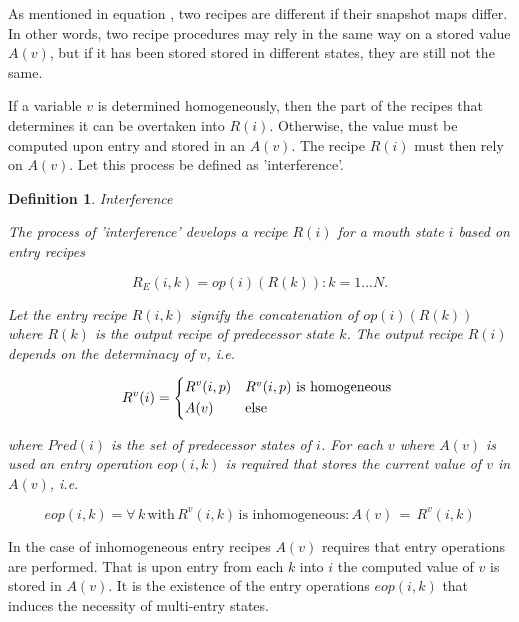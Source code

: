 \documentclass[12pt,a4paper]{scrartcl}
\newtheorem{definition}{Definition}
\begin{document}
As mentioned in equation \label{eq:snapshot-map-difference}, two recipes are
different if their snapshot maps differ. In other words, two recipe procedures
may rely in the same way on a stored value $A(v)$, but if it has been stored
stored in different states, they are still not the same.

If a variable $v$ is determined homogeneously, then the part of the recipes
that determines it can be overtaken into $R(i)$. Otherwise, the value must be
computed upon entry and stored in an $A(v)$. The recipe $R(i)$ must then rely
on $A(v)$. Let this process be defined as 'interference'.

\begin{definition}
Interference

The process of 'interference' develops a recipe $R(i)$ for a mouth state
$i$ based on entry recipes 

\begin{equation}
    R_E(i,k) = { op(i)(R(k)): k = 1...N }. 
\end{equation}
              
Let the entry recipe $R(i,k)$ signify the concatenation of $op(i)(R(k))$
where $R(k)$ is the output recipe of predecessor state $k$. The output
recipe $R(i)$ depends on the determinacy of $v$, i.e. 
          
\begin{equation}
    R^v(i) = \begin{dcases*}
              R^v(i,p) & $R^v(i,p)$ is homogeneous \\
              A(v)     & else
             \end{dcases*}
\end{equation}

where $Pred(i)$ is the set of predecessor states of $i$. For each $v$ where
$A(v)$ is used an entry operation $eop(i,k)$ is required that stores the current
value of $v$ in $A(v)$, i.e.

\begin{equation}
    eop(i,k) = { \forall\,k\,\mbox{with}\,R^v(i,k)\,\mbox{is inhomogeneous}: A(v)\,=\,R^v(i,k) }
\end{equation}

\end{definition}

In the case of inhomogeneous entry recipes $A(v)$ requires that entry
operations are performed.  That is upon entry from each $k$ into $i$ the
computed value of $v$ is stored in $A(v)$.  It is the existence of the entry
operations $eop(i,k)$ that induces the necessity of multi-entry states.  
\end{document}
